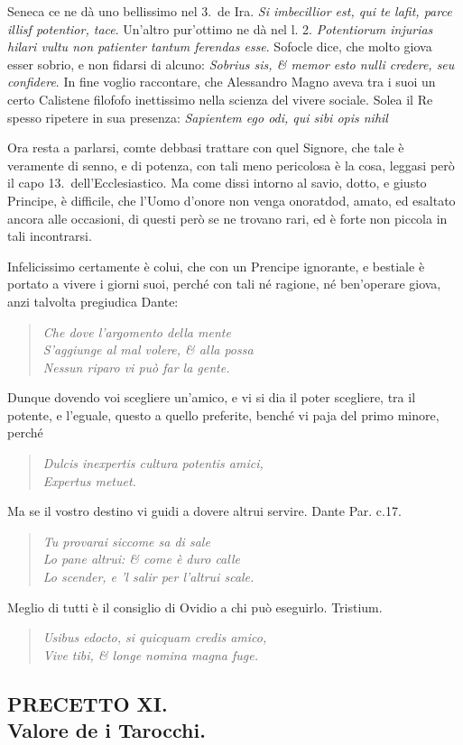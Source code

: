 \documentclass[11pt,a6paper]{article}
\newcommand{\literaryquote}[1]{%
\kern -6pt  \begin{verse}
    {\footnotesize \it #1}
  \end{verse}\kern -2pt%
}
\begin{document}
{Seneca ce ne dà uno bellissimo nel 3.\ de Ira.
\textit{Si imbecillior est, qui te lafit, parce illisf potentior,
 tace}. Un'altro pur'ottimo ne dà nel l. 2. \textit{
 Potentiorum injurias hilari vultu non patienter tantum ferendas
 esse}. Sofocle dice, che molto giova esser
sobrio, e non fidarsi di alcuno: \textit{Sobrius sis, \& memor
 esto nulli credere, seu confidere}. In fine voglio
raccontare, che Alessandro Magno aveva tra i suoi
un certo Calistene filofofo inettissimo nella scienza
del vivere sociale. Solea il Re spesso ripetere in sua
presenza: \textit{Sapientem ego odi, qui sibi opis nihil}

Ora resta a parlarsi, comte debbasi trattare con
quel Signore, che tale è veramente di senno, e di
potenza, con tali meno pericolosa è la cosa, leggasi
però il capo 13.\ dell'Ecclesiastico. Ma come dissi
intorno al savio, dotto, e giusto Principe, è difficile,
che l'Uomo d'onore non venga onoratdod, amato,
ed esaltato ancora alle occasioni, di questi però se ne
trovano rari, ed è forte non piccola in tali incontrarsi.

Infelicissimo certamente è colui, che con un
Prencipe ignorante, e bestiale è portato a vivere i
giorni suoi, perché con tali né ragione, né ben'operare
giova, anzi talvolta pregiudica Dante:
\literaryquote{
Che dove l'argomento della mente \\
S'aggiunge al mal volere, \& alla possa\\
Nessun riparo vi può far la gente.}

Dunque dovendo voi scegliere un'amico, e vi si dia
il poter scegliere, tra il potente, e l'eguale, questo
a quello preferite, benché vi paja del primo minore, perché
\literaryquote{
Dulcis inexpertis cultura potentis amici, \\
Expertus metuet.}

Ma se il vostro destino vi guidi a dovere altrui servire.
Dante Par. c.17.
\literaryquote{
Tu provarai siccome sa di sale\\
Lo pane altrui: \& come è duro calle\\
Lo scender, e 'l salir per l'altrui scale.}

Meglio di tutti è il consiglio di Ovidio a chi può eseguirlo.
Tristium.
\literaryquote{
Usibus edocto, si quicquam credis amico, \\
Vive tibi, \& longe nomina magna fuge.}
}

\clearpage
\subsection{PRECETTO XI.\\
 \footnotesize Valore de i Tarocchi.}
\end{document}
